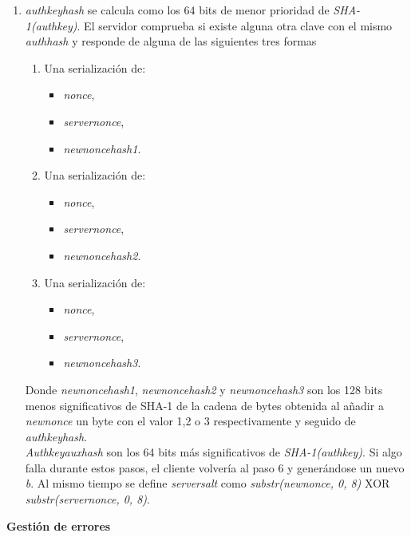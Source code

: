 \begin{enumerate}
	\item \emph{auth\textunderscore key\textunderscore hash} se calcula como los 64 bits de menor prioridad de \emph{SHA-1(auth\textunderscore key)}. El servidor comprueba si existe alguna otra clave con el mismo \emph{auth\textunderscore hash} y responde de alguna de las siguientes tres formas
	\begin{enumerate}
		\item Una serialización de: 
			\begin{itemize}
				\item \emph{nonce},
				\item \emph{server\textunderscore nonce},
				\item \emph{new\textunderscore nonce\textunderscore hash1}.
			\end{itemize}
		\item Una serialización de:
			\begin{itemize}
				\item \emph{nonce},	
				\item \emph{server\textunderscore nonce},
				\item \emph{new\textunderscore nonce\textunderscore hash2}.
			\end{itemize}
		\item Una serialización de:
			\begin{itemize}
				\item \emph{nonce},	
				\item \emph{server\textunderscore nonce},
				\item \emph{new\textunderscore nonce\textunderscore hash3}.
			\end{itemize}
	\end{enumerate}
	Donde \emph{new\textunderscore nonce\textunderscore hash1}, \emph{new\textunderscore nonce\textunderscore hash2} y \emph{new\textunderscore nonce\textunderscore hash3} son los 128 bits menos significativos de SHA-1 de la cadena de bytes obtenida al añadir a \emph{new\textunderscore nonce} un byte con el valor 1,2 o 3 respectivamente y seguido de \emph{auth\textunderscore key\textunderscore hash}.\\
	\emph{Auth\textunderscore key\textunderscore aux\textunderscore hash} son los 64 bits más significativos de \emph{SHA-1(auth\textunderscore key)}.
	Si algo falla durante estos pasos, el cliente volvería al paso 6 y generándose un nuevo \emph{b}. Al mismo tiempo se define \emph{server\textunderscore salt} como \emph{substr(new\textunderscore nonce, 0, 8)} XOR \emph{substr(server\textunderscore nonce, 0, 8)}.\\
	
\end{enumerate}
\textbf{Gestión de errores}

